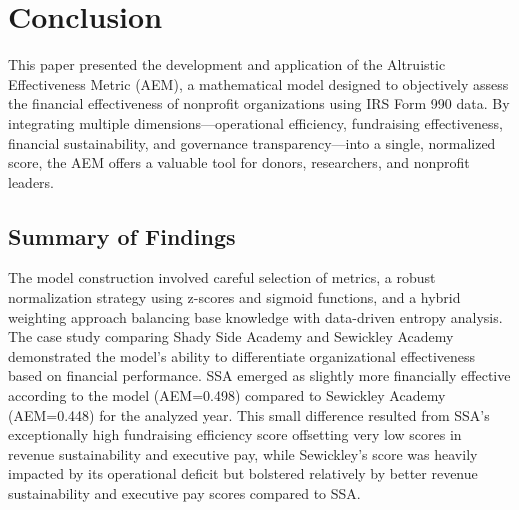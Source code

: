\documentclass[12pt]{article}
\begin{document}
\section{Conclusion} %

This paper presented the development and application of the Altruistic Effectiveness Metric (AEM), a mathematical model designed to objectively assess the financial effectiveness of nonprofit organizations using IRS Form 990 data. By integrating multiple dimensions—operational efficiency, fundraising effectiveness, financial sustainability, and governance transparency—into a single, normalized score, the AEM offers a valuable tool for donors, researchers, and nonprofit leaders.

\subsection{Summary of Findings} %
The model construction involved careful selection of metrics, a robust normalization strategy using z-scores and sigmoid functions, and a hybrid weighting approach balancing base knowledge with data-driven entropy analysis. The case study comparing Shady Side Academy and Sewickley Academy demonstrated the model's ability to differentiate organizational effectiveness based on financial performance. SSA emerged as slightly more financially effective according to the model (AEM=0.498) compared to Sewickley Academy (AEM=0.448) for the analyzed year. This small difference resulted from SSA's exceptionally high fundraising efficiency score offsetting very low scores in revenue sustainability and executive pay, while Sewickley's score was heavily impacted by its operational deficit but bolstered relatively by better revenue sustainability and executive pay scores compared to SSA.
\end{document}
